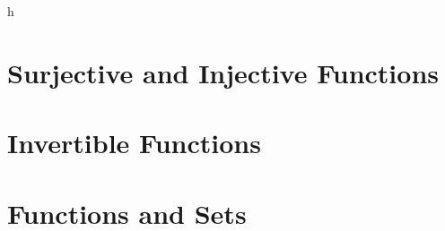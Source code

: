 \documentclass[10pt,reqno]{book}
\theoremstyle{plain}
\begin{document}
	h
	
	\section{Surjective and Injective Functions}
	
	
	
	
	
	
	
	
	
	
	
	
	
	
	
	
	
	
	
	
	
	
	
	
	
	\section{Invertible Functions}
	
	\section{Functions and Sets}
	
	
	\pagestyle{plain}
\end{document}
